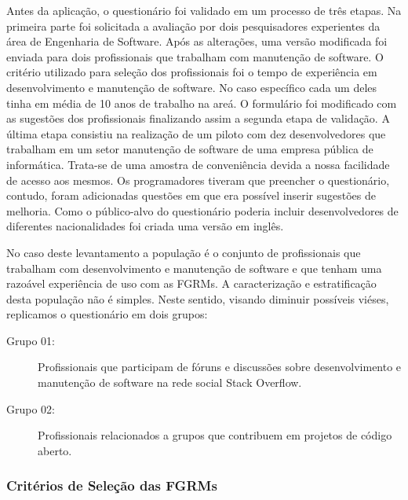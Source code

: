 Antes da aplicação, o questionário foi validado em um processo de três etapas.
Na primeira parte foi solicitada a avaliação por dois pesquisadores experientes
da área de Engenharia de Software. Após as alterações, uma versão modificada foi
enviada para dois profissionais que trabalham com manutenção de software. O
critério utilizado para seleção dos profissionais foi o tempo de experiência em
desenvolvimento e manutenção de software. No caso específico cada um deles tinha
em média de 10 anos de trabalho na areá. O formulário foi modificado com as
sugestões dos profissionais finalizando assim a segunda etapa de validação. A
última etapa consistiu na realização de um piloto com dez desenvolvedores que
trabalham em um setor manutenção de software de uma empresa pública de
informática. Trata-se de uma amostra de conveniência devida a nossa facilidade
de acesso aos mesmos. Os programadores tiveram que preencher o questionário,
contudo, foram adicionadas questões em que era possível inserir sugestões de
melhoria. Como o público-alvo do questionário poderia incluir desenvolvedores de
diferentes nacionalidades foi criada uma versão em inglês.

No caso deste levantamento a população é o conjunto de profissionais que
trabalham com desenvolvimento e manutenção de software e que tenham uma razoável
experiência de uso com as FGRMs. A caracterização e estratificação desta
população não é simples. Neste sentido, visando diminuir possíveis viéses,
replicamos o questionário em dois grupos:

\begin{description}
	\item[Grupo 01:] Profissionais que participam de fóruns e discussões sobre
		desenvolvimento e manutenção de software na rede social Stack Overflow.
	\item[Grupo 02:] Profissionais relacionados a grupos que contribuem em
		projetos de código aberto.
\end{description}


\subsubsection{Critérios de Seleção das FGRMs}
\label{ssub:metodologia_criterios_selecao}

